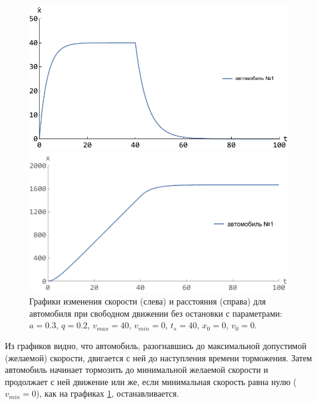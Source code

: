 \documentclass[12pt, a4paper]{extarticle}
\numberwithin{equation}{section}
\numberwithin{figure}{section}
\begin{document}
\begin{figure}[h!]
	\begin{center}
		\begin{minipage}[h!]{0.48\linewidth}
			\includegraphics[width=1\linewidth,height=0.2\textheight]
			{Images/free_drive_speed_with_stop.pdf}
		\end{minipage}
		\hfill 
		\begin{minipage}[h!]{0.48\linewidth}
			\includegraphics[width=1\linewidth,height=0.2\textheight]
			{Images/free_drive_distance_with_stop.pdf}
		\end{minipage}
		\caption{Графики изменения скорости (слева) и расстояния (справа) для автомобиля при свободном движении без остановки с параметрами: $a=0.3$, $q=0.2$, $v_{max}=40$, $v_{min}=0$, $t_s=40$, $x_0=0$, $v_0=0$.}
		\label{free_drive_with_stop}
	\end{center}
\end{figure}

Из графиков видно, что автомобиль, разогнавшись до максимальной допустимой (желаемой) скорости, двигается с ней до наступления времени торможения. Затем автомобиль начинает тормозить до минимальной желаемой скорости и продолжает с ней движение или же, если минимальная скорость равна нулю ($v_{min}=0$), как на графиках \ref{free_drive_with_stop}, останавливается.
 
\end{document}
